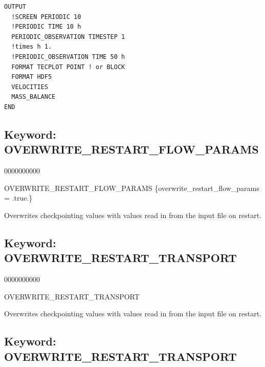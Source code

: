 \begin{mdframed}


\footnotesize
\begin{verbatim}
OUTPUT
  !SCREEN PERIODIC 10
  !PERIODIC TIME 10 h
  PERIODIC_OBSERVATION TIMESTEP 1
  !times h 1.
  !PERIODIC_OBSERVATION TIME 50 h
  FORMAT TECPLOT POINT ! or BLOCK
  FORMAT HDF5
  VELOCITIES
  MASS_BALANCE
END
\end{verbatim}
\normalsize
\end{mdframed}

\hyperlink{target_key}{\return}


\newpage
\protect\hypertarget{target_overwrite_restart_flow}{}

\subsection{Keyword: OVERWRITE\_RESTART\_FLOW\_PARAMS}

\hfill\hyperlink{target_key}{\return}

\begin{deflist}{0000000000}
\item[OVERWRITE\_RESTART\_FLOW\_PARAMS] \{overwrite\_restart\_flow\_params = .true.\}
\end{deflist}

Overwrites checkpointing values with values read in from the input file on restart.

\protect\hypertarget{target_overwrite_restart}{}

\subsection{Keyword: OVERWRITE\_RESTART\_TRANSPORT}

\hfill\hyperlink{target_key}{\return}

\begin{deflist}{0000000000}
\item[OVERWRITE\_RESTART\_TRANSPORT] ~
\end{deflist}

Overwrites checkpointing values with values read in from the input file on restart.

\protect\hypertarget{target_overwrite}{}

\subsection{Keyword: OVERWRITE\_RESTART\_TRANSPORT}

